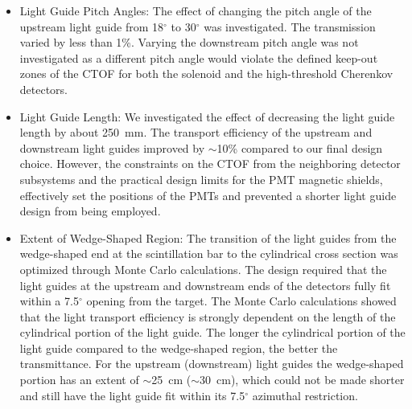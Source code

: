 \documentclass{elsart}
\begin{document}
\begin{itemize}

\item Light Guide Pitch Angles: The effect of changing the pitch angle of the upstream light 
guide from 18$^\circ$ to 30$^\circ$ was investigated. The transmission varied by less than 1\%. 
Varying the downstream pitch angle was not investigated as a different pitch angle would 
violate the defined keep-out zones of the CTOF for both the solenoid and the high-threshold 
Cherenkov detectors.

\vskip 0.5cm

\item Light Guide Length: We investigated the effect of decreasing the light guide length by 
about 250~mm. The transport efficiency of the upstream and downstream light guides improved 
by $\sim$10\% compared to our final design choice. However, the constraints on the CTOF from 
the neighboring detector subsystems and the practical design limits for the PMT magnetic 
shields, effectively set the positions of the PMTs and prevented a shorter light guide design 
from being employed.

\vskip 0.5cm

\item Extent of Wedge-Shaped Region: The transition of the light guides from the wedge-shaped 
end at the scintillation bar to the cylindrical cross section was optimized through Monte 
Carlo calculations. The design required that the light guides at the upstream and downstream 
ends of the detectors fully fit within a 7.5$^\circ$ opening from the target. The Monte Carlo 
calculations showed that the light transport efficiency is strongly dependent on the length 
of the cylindrical portion of the light guide. The longer the cylindrical portion of the light 
guide compared to the wedge-shaped region, the better the transmittance. For the upstream 
(downstream) light guides the wedge-shaped portion has an extent of $\sim$25~cm ($\sim$30~cm), 
which could not be made shorter and still have the light guide fit within its 7.5$^\circ$ 
azimuthal restriction.

\vskip 0.5cm


\end{itemize}
\end{document}
